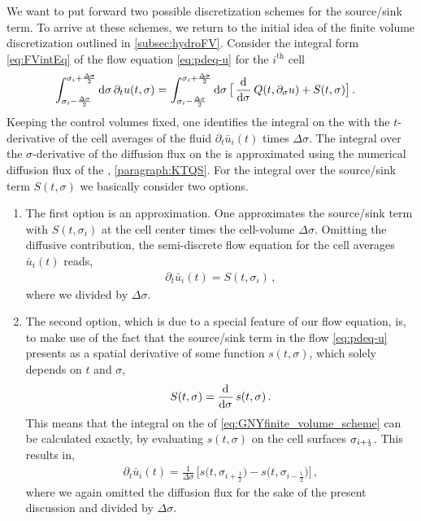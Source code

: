 We want to put forward two possible discretization schemes for the source/sink term.
To arrive at these schemes, we return to the initial idea of the finite volume discretization outlined in \cref{subsec:hydroFV}.
Consider the integral form \eqref{eq:FVintEq} of the flow equation \eqref{eq:pdeq-u} for the $i^\text{th}$ cell 
\begin{align}
 \int_{\sigma_i - \frac{\Delta \sigma}{2}}^{\sigma_i + \frac{\Delta \sigma}{2}} \dif \sigma \, \partial_t u ( t, \sigma ) = \, & \int_{\sigma_i - \frac{\Delta \sigma}{2}}^{\sigma_i + \frac{\Delta \sigma}{2}} \dif \sigma \, \big[ \dod{}{\sigma} Q ( t, \partial_\sigma u ) + S ( t, \sigma ) \big] \, .\label{eq:GNYfinite_volume_scheme}
\end{align}
Keeping the control volumes fixed, one identifies the integral on the \lhs{} with the $t$-derivative of the cell averages of the fluid $\partial_t \bar{u}_i ( t )$ times $\Delta \sigma$. 
The integral over the $\sigma$-derivative of the diffusion flux on the \rhs{} is approximated using the numerical diffusion flux of the \ktScheme{}, \cf{} \cref{paragraph:KTQS}.
For the integral over the source/sink term $S ( t, \sigma )$ we basically consider two options.
\begin{enumerate}
	\item	The first option is an approximation. One approximates the source/sink term with $S ( t, \sigma_i )$ at the cell center times the cell-volume $\Delta \sigma$. Omitting the diffusive contribution, the semi-discrete flow equation for the cell averages $\bar{u}_i ( t )$ reads,
		\begin{align}
			\partial_t \bar{u}_i ( t ) = S ( t, \sigma_i ) \, ,	\label{eq:source_sink_1}
		\end{align}
	where we divided by $\Delta \sigma$.
	
	\item	The second option, which is due to a special feature of our \frg{} flow equation, is, to make use of the fact that the source/sink term in the flow \cref{eq:pdeq-u} presents as a spatial derivative of some function $s ( t, \sigma )$, which solely depends on $t$ and $\sigma$,
		\begin{align}
			S ( t, \sigma ) = \dod{}{\sigma}  s ( t, \sigma ) \, .	\label{eq:source_2}
		\end{align}
	This means that the integral on the \rhs{} of \cref{eq:GNYfinite_volume_scheme} can be calculated exactly, by evaluating $s ( t, \sigma )$ on the cell surfaces $\sigma_{i + \ttfrac{1}{2}}$.
	This results in,
		\begin{align}
			\partial_t \bar{u}_i ( t ) = \tfrac{1}{\Delta \sigma} \, \big[ s \big( t, \sigma_{i + \frac{1}{2}} \big) - s \big( t, \sigma_{i - \frac{1}{2}} \big) \big] \, ,	\label{eq:source_sink_2}
		\end{align}
	where we again omitted the diffusion flux for the sake of the present discussion and divided by $\Delta \sigma$.
\end{enumerate}

